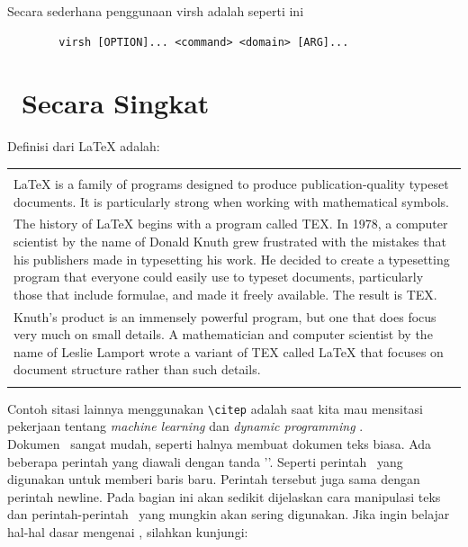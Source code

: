 Secara sederhana penggunaan virsh adalah seperti ini
\begin{center}
	\begin{verbatim}
		virsh [OPTION]... <command> <domain> [ARG]...
	\end{verbatim}
\end{center}

\section{\latex~Secara Singkat}
Definisi dari LaTeX \citep{lankton2008introduction} adalah: \\ 
\begin{tabular}{| p{13cm} |}
	\hline 
	\\
	LaTeX is a family of programs designed to produce publication-quality 
	typeset documents. It is particularly strong when working with 
	mathematical symbols. \\	
	The history of LaTeX begins with a program called TEX. In 1978, a 
	computer scientist by the name of Donald Knuth grew frustrated with the 
	mistakes that his publishers made in typesetting his work. He decided 
	to create a typesetting program that everyone could easily use to 
	typeset documents, particularly those that include formulae, and made 
	it freely available. The result is TEX. \\	
	Knuth's product is an immensely powerful program, but one that does 
	focus very much on small details. A mathematician and computer 
	scientist by the name of Leslie Lamport wrote a variant of TEX called 
	LaTeX that focuses on document structure rather than such details. \\
	\\
	\hline
\end{tabular}

\vspace*{0.8cm}

Contoh sitasi lainnya menggunakan \verb|\citep| adalah saat kita mau mensitasi pekerjaan tentang \textit{machine learning} \citep{chin2000learning} dan \textit{dynamic programming} \citep{barto1995learning}. \\

Dokumen \latex~sangat mudah, seperti halnya membuat dokumen teks biasa. Ada 
beberapa perintah yang diawali dengan tanda '\bslash'. 
Seperti perintah \bslash\bslash~yang digunakan untuk memberi baris baru. 
Perintah tersebut juga sama dengan perintah \bslash newline. 
Pada bagian ini akan sedikit dijelaskan cara manipulasi teks dan 
perintah-perintah \latex~yang mungkin akan sering digunakan. 
Jika ingin belajar hal-hal dasar mengenai \latex, silahkan kunjungi: 

